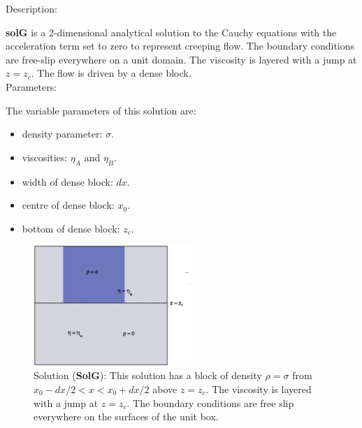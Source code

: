   {\large \fontB Description:}
  
  {\bf solG} is a 2-dimensional analytical solution to the Cauchy equations with the acceleration term set to zero
  to represent creeping flow. The boundary conditions are free-slip everywhere on a unit domain. 
  The viscosity is layered with a jump at $ z=z_c $.
  The flow is driven by a dense block.
  \\

  {\large \fontB Parameters:}
 
  The variable parameters of this solution are:
  \begin{itemize}
    \item{density parameter: $ \sigma $.}
    \item{viscosities: $\eta_A$ and $\eta_B$.}
    \item{width of dense block: $dx$.}
    \item{centre of dense block: $x_0$.}
    \item{bottom of dense block: $z_c$.}
    \end{itemize}

  \begin{figure}
    \includegraphics[width=6cm,clip]{../figs/figG.eps}
    \caption[Short caption]{\label{figG} 
      Solution ({\bf SolG}):
      This solution has a block of density $\rho = \sigma$ from $x_0-dx/2 < x < x_0+dx/2$ above
      $ z= z_c$.
      The viscosity is layered with a jump at $ z=z_c $.
      The boundary conditions are free slip everywhere on the surfaces of the unit box.}
  \end{figure} 
  

